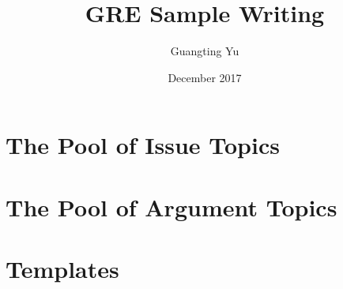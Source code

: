 \documentclass[12pt,oneside,a4paper]{book}
\title{GRE Sample Writing}
\author{Guangting Yu}
\date{December 2017}
\begin{document}
\maketitle
\tableofcontents

\chapter{The Pool of Issue Topics}






\chapter{The Pool of Argument Topics}




\chapter{Templates}

\end{document}
